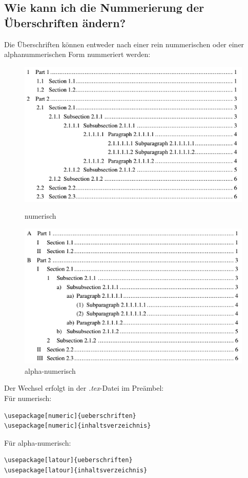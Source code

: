 \documentclass[12pt]{article}
\begin{document}
\subsection{Wie kann ich die Nummerierung der Überschriften ändern?}
Die Überschriften können entweder nach einer rein nummerischen oder einer alphanummerischen Form nummeriert werden:
\begin{figure}[ht]
    \centering
    \begin{minipage}[t]{0.49\linewidth}
        \centering
        \includegraphics[width=\linewidth]{dokuImages/toc_num.png}
        \caption{numerisch}
    \end{minipage}%
    \hfill
    \begin{minipage}[t]{0.49\linewidth}
        \centering
        \includegraphics[width=\linewidth]{dokuImages/toc_alphanum.png}
        \caption{alpha-numerisch}
    \end{minipage}
\end{figure}
Der Wechsel erfolgt in der \textit{.tex}-Datei im Preämbel:\\[6pt]
Für numerisch:
\begin{verbatim}
\usepackage[numeric]{ueberschriften}
\usepackage[numeric]{inhaltsverzeichnis}
\end{verbatim}
Für alpha-numerisch:
\begin{verbatim}
\usepackage[latour]{ueberschriften}
\usepackage[latour]{inhaltsverzeichnis}
\end{verbatim}
\end{document}

